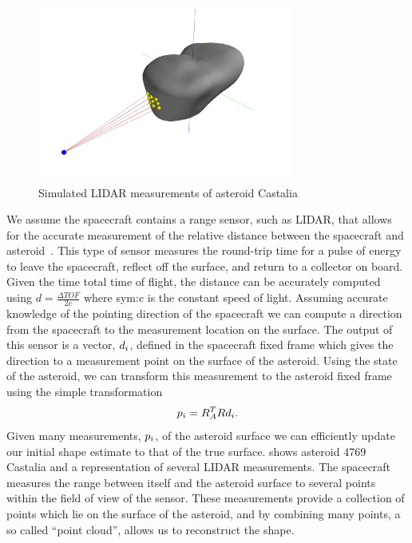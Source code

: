 \begin{figure}
    \centering
    \includegraphics[width=0.75\textwidth]{figures/2018_SSPI/castalia_raycasting_plot.jpg}
    \caption{Simulated LIDAR measurements of asteroid Castalia~\label{fig:lidar_example}}
\end{figure}
We assume the spacecraft contains a range sensor, such as LIDAR, that allows for the accurate measurement of the relative distance between the spacecraft and asteroid~\cite{zuber1997,zuber2000}.
This type of sensor measures the round-trip time for a pulse of energy to leave the spacecraft, reflect off the surface, and return to a collector on board.
Given the time total time of flight, the distance can be accurately computed using \( d = \frac{\Delta TOF}{2 c} \) where \gls{sym:c} is the constant speed of light.
Assuming accurate knowledge of the pointing direction of the spacecraft we can compute a direction from the spacecraft to the measurement location on the surface.
The output of this sensor is a vector, \( d_i \), defined in the spacecraft fixed frame which gives the direction to a measurement point on the surface of the asteroid. 
Using the state of the asteroid, we can transform this measurement to the asteroid fixed frame using the simple transformation
\begin{align*}
    p_i = R_A^T R d_i .
\end{align*}
Given many measurements, \( p_i \), of the asteroid surface we can efficiently update our initial shape estimate to that of the true surface.
 shows asteroid 4769 Castalia and a representation of several LIDAR measurements. 
The spacecraft measures the range between itself and the asteroid surface to several points within the field of view of the sensor. 
These measurements provide a collection of points which lie on the surface of the asteroid, and by combining many points, a so called ``point cloud'', allows us to reconstruct the shape.

